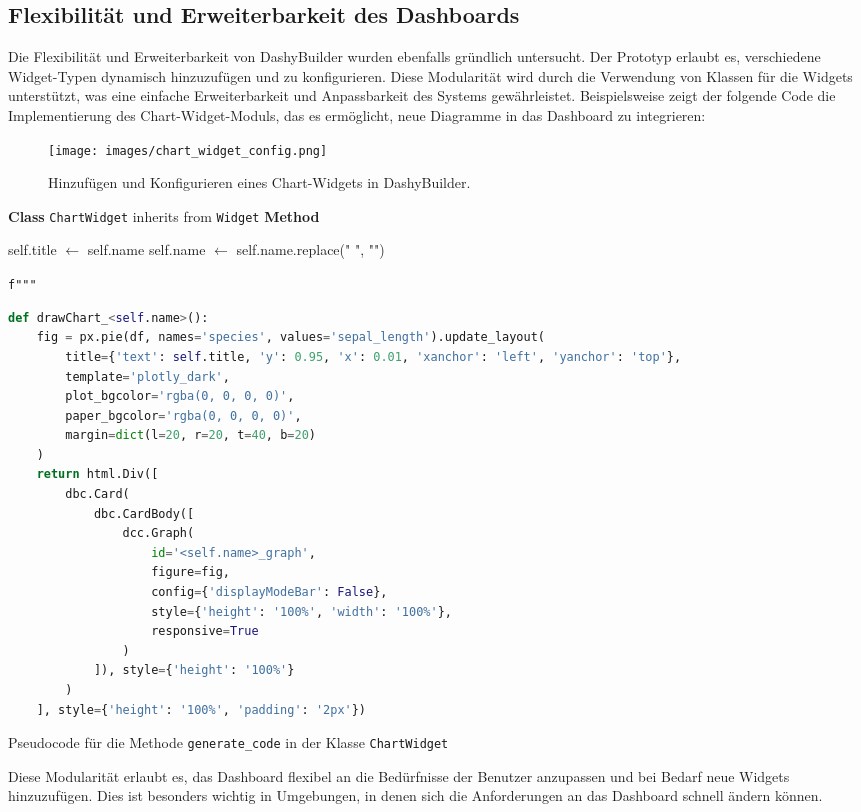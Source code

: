 \documentclass[a4paper, 12pt]{scrartcl}
\begin{document}
\subsection{Flexibilität und Erweiterbarkeit des Dashboards}
Die Flexibilität und Erweiterbarkeit von DashyBuilder wurden ebenfalls gründlich untersucht. Der Prototyp erlaubt es, verschiedene Widget-Typen dynamisch hinzuzufügen und zu konfigurieren. Diese Modularität wird durch die Verwendung von Klassen für die Widgets unterstützt, was eine einfache Erweiterbarkeit und Anpassbarkeit des Systems gewährleistet. Beispielsweise zeigt der folgende Code die Implementierung des Chart-Widget-Moduls, das es ermöglicht, neue Diagramme in das Dashboard zu integrieren:
\begin{figure}[H]
    \centering
    \texttt{[image: images/chart\_widget\_config.png]}
    \caption{Hinzufügen und Konfigurieren eines Chart-Widgets in DashyBuilder.}
    \label{fig:chart_widget_config}
\end{figure}
\begin{algorithm}[H]
\small %
\SetAlgoLined
{}


\textbf{Class} \texttt{ChartWidget} inherits from \texttt{Widget}\;
\textbf{Method} \GenerateCode{}\;

self.title $\gets$ self.name\;
self.name $\gets$ self.name.replace(" ", "")\;

\Return \texttt{f"""}

\begin{lstlisting}[language=Python]
def drawChart_<self.name>():
    fig = px.pie(df, names='species', values='sepal_length').update_layout(
        title={'text': self.title, 'y': 0.95, 'x': 0.01, 'xanchor': 'left', 'yanchor': 'top'},
        template='plotly_dark',
        plot_bgcolor='rgba(0, 0, 0, 0)',
        paper_bgcolor='rgba(0, 0, 0, 0)',
        margin=dict(l=20, r=20, t=40, b=20)
    )
    return html.Div([
        dbc.Card(
            dbc.CardBody([
                dcc.Graph(
                    id='<self.name>_graph',
                    figure=fig,
                    config={'displayModeBar': False},
                    style={'height': '100%', 'width': '100%'},
                    responsive=True
                )
            ]), style={'height': '100%'}
        )
    ], style={'height': '100%', 'padding': '2px'})
\end{lstlisting}

\caption{Pseudocode für die Methode \texttt{generate\_code} in der Klasse \texttt{ChartWidget}}
\end{algorithm}
Diese Modularität erlaubt es, das Dashboard flexibel an die Bedürfnisse der Benutzer anzupassen und bei Bedarf neue Widgets hinzuzufügen. Dies ist besonders wichtig in Umgebungen, in denen sich die Anforderungen an das Dashboard schnell ändern können.
\newpage
\end{document}
